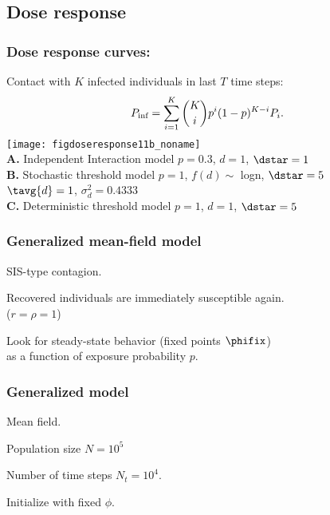 \subsection{Dose response}

\begin{frame}
  \frametitle{Dose response curves:}

  Contact with $K$ infected individuals in last $T$ time steps:
  $$
  P_{\textnormal{inf}} 
  = \sum_{i=1}^K
  \binom{K}{i} 
  p^i (1 -p)^{K-i} P_i.
  $$
  \texttt{[image: figdoseresponse11b\_noname]}\\

  \textbf{A.} Independent Interaction model
  \hfill 
  {\small $p=0.3$, 
    $d = 1$, 
    $\dstar=1$}\\
  \smallskip
  \textbf{B.} Stochastic threshold model
  \hfill
  {\small $p=1$, 
    $f(d) \sim$ logn,
    $\dstar=5$}\\
  \mbox{}
  \hfill
  {\small $\tavg{d} = 1$, $\sigma_d^2 = 0.4333$}\\
  \smallskip
  \textbf{C.} Deterministic threshold model
  \hfill
  {\small $p=1$, 
    $d=1$,
    $\dstar=5$}

\end{frame}





\begin{frame}
  \frametitle{Generalized mean-field model}

  SIS-type contagion.

  Recovered individuals are immediately susceptible again.\\
  ($r=\rho=1$)
  
  Look for steady-state behavior (fixed points $\phifix$)\\
  as a function of exposure probability $p$.


\end{frame}


\begin{frame}
  \frametitle{Generalized model}


  Mean field.

  Population size $N = 10^5$

  Number of time steps $N_t = 10^4$.

  Initialize with fixed $\phi$.

\end{frame}

